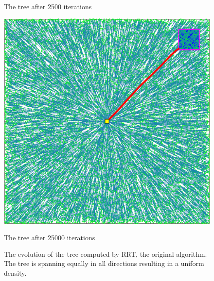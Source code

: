 \documentclass[conference]{IEEEtran}
\begin{document}
\begin{figure}[h]
\begin{minipage}[t]{0.3\linewidth}
\caption{The tree after 2500 iterations}
\end{minipage}
\hfill
\begin{minipage}[t]{0.3\linewidth}
\centering
\includegraphics[width=1\textwidth]{images/RRT/ARSLAN/03.png}
\caption{The tree after 25000 iterations}
\end{minipage}
\caption{The evolution of the tree computed by RRT, the original algorithm. The tree is spanning equally in all directions resulting in a uniform density.}
\end{figure}
\end{document}
